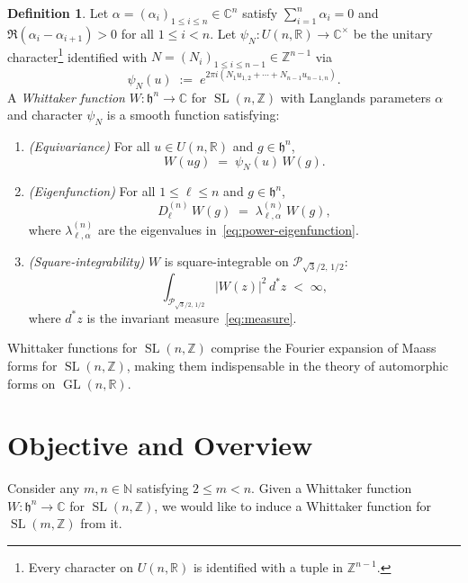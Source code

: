 \documentclass[12pt, reqno, oneside]{amsart}
\theoremstyle{definition}
\newtheorem{definition}[theorem]{Definition}
\numberwithin{equation}{section}
\newcommand{\N}{\mathbb{N}}
\newcommand{\Z}{\mathbb{Z}}
\newcommand{\R}{\mathbb{R}}
\newcommand{\C}{\mathbb{C}}
\newcommand{\hh}{\mathfrak{h}}
\DeclareMathOperator{\GL}{GL}
\DeclareMathOperator{\SL}{SL}
\begin{document}
\begin{definition}\label{def:whittaker}
Let $\alpha=(\alpha_i)_{1\leq i\leq n}\in\C^n$ satisfy $\sum_{i=1}^n
\alpha_i=0$ and $\Re(\alpha_i-\alpha_{i+1})>0$ for all $1\leq i<n$. Let
$\psi_N:U(n,\R)\to\C^\times$ be the unitary character\footnote{Every
character on $U(n,\R)$ is identified with a tuple in $\Z^{n-1}$.}
identified with $N=(N_i)_{1\leq i\leq n-1}\in\Z^{n-1}$ via
\[
  \psi_N(u) \;:=\; e^{2\pi i(N_1 u_{1,2}+\cdots+N_{n-1}u_{n-1,n})}.
\]
A \emph{Whittaker function} $W:\hh^n\to\C$ for $\SL(n,\Z)$ with Langlands
parameters $\alpha$ and character $\psi_N$ is a smooth function satisfying:
\begin{enumerate}[label=(\arabic*)]
  \item \textit{(Equivariance)} For all $u\in U(n,\R)$ and $g\in\hh^n$,
    \[
      W(ug) \;=\; \psi_N(u)\,W(g).
    \]
  \item \textit{(Eigenfunction)} For all $1\leq\ell\leq n$ and
    $g\in\hh^n$,
    \[
      D_\ell^{(n)}\,W(g) \;=\; \lambda_{\ell,\alpha}^{(n)}\,W(g),
    \]
    where $\lambda_{\ell,\alpha}^{(n)}$ are the eigenvalues
    in~\eqref{eq:power-eigenfunction}.
  \item \textit{(Square-integrability)} $W$ is square-integrable on
    $\mathcal{P}_{\!\sqrt{3}/2,\,1/2}$:
    \[
      \int_{\mathcal{P}_{\!\sqrt{3}/2,\,1/2}} |W(z)|^2\,d^*z \;<\; \infty,
    \]
    where $d^*z$ is the invariant measure~\eqref{eq:measure}.
\end{enumerate}
\end{definition}

Whittaker functions for $\SL(n,\Z)$ comprise the Fourier
expansion of Maass forms for $\SL(n,\Z)$, making them indispensable in
the theory of automorphic forms on $\GL(n,\R)$.

\section{Objective and Overview}
\label{sec:overview}

Consider any $m,n\in\N$ satisfying $2\leq m<n$. Given a Whittaker
function $W:\hh^n\to\C$ for $\SL(n,\Z)$, we would like to induce a
Whittaker function for $\SL(m,\Z)$ from it.
\end{document}
